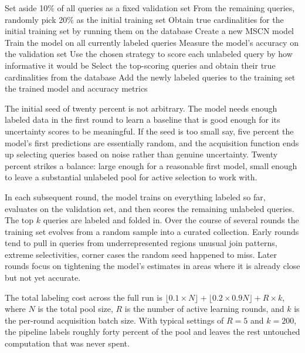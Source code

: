 \begin{algorithm}[htbp]
\caption{Active Learning for Cardinality Estimation}
\label{alg:active_learning_full}
\begin{algorithmic}[1]
\State Set aside 10\% of all queries as a fixed validation set
\State From the remaining queries, randomly pick 20\% as the initial training set
\State Obtain true cardinalities for the initial training set by running them on the database
\State Create a new MSCN model
    \State Train the model on all currently labeled queries
    \State Measure the model's accuracy on the validation set
    \State Use the chosen strategy to score each unlabeled query by how informative it would be
    \State Select the top-scoring queries and obtain their true cardinalities from the database
    \State Add the newly labeled queries to the training set
\EndFor
\State \Return the trained model and accuracy metrics
\end{algorithmic}
\end{algorithm}

The initial seed of twenty percent is not arbitrary. The model needs enough labeled data in the first round to learn a baseline that is good enough for its uncertainty scores to be meaningful. If the seed is too small say, five percent the model's first predictions are essentially random, and the acquisition function ends up selecting queries based on noise rather than genuine uncertainty. Twenty percent strikes a balance: large enough for a reasonable first model, small enough to leave a substantial unlabeled pool for active selection to work with.

In each subsequent round, the model trains on everything labeled so far, evaluates on the validation set, and then scores the remaining unlabeled queries. The top $k$ queries are labeled and folded in. Over the course of several rounds the training set evolves from a random sample into a curated collection. Early rounds tend to pull in queries from underrepresented regions unusual join patterns, extreme selectivities, corner cases the random seed happened to miss. Later rounds focus on tightening the model's estimates in areas where it is already close but not yet accurate.

The total labeling cost across the full run is $\lfloor 0.1 \times N \rfloor + \lfloor 0.2 \times 0.9N \rfloor + R \times k$, where $N$ is the total pool size, $R$ is the number of active learning rounds, and $k$ is the per-round acquisition batch size. With typical settings of $R = 5$ and $k = 200$, the pipeline labels roughly forty percent of the pool and leaves the rest untouched computation that was never spent.


